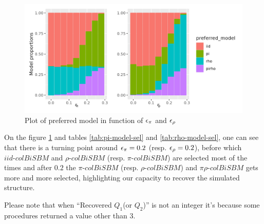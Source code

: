 \begin{figure}[H]
\includegraphics{./Rcodes/simulation/img/plot_model_function_eps.png}
\caption{Plot of preferred model in function of $\eps[\pi]$ and $\eps[\rho]$}
\label{fig:pref_model_func_eps}
\end{figure}

On the figure \ref{fig:pref_model_func_eps} and tables
\ref{tab:pi-model-sel} and \ref{tab:rho-model-sel}, one can see that
there is a turning point around \(\eps[\pi] = 0.2\) (resp.
\(\eps[\rho] = 0.2\)), before which \(iid\text{-}colBiSBM\) and
\(\rho\text{-}colBiSBM\) (resp. \(\pi\text{-}colBiSBM\)) are selected
most of the times and after \(0.2\) the \(\pi\text{-}colBiSBM\) (resp.
\(\rho\text{-}colBiSBM\)) and \(\pi\rho\text{-}colBiSBM\) gets more and
more selected, highlighting our capacity to recover the simulated
structure.

Please note that when ``Recovered \(Q_1\)(or \(Q_2\))'' is not an
integer it's because some procedures returned a value other than 3.
